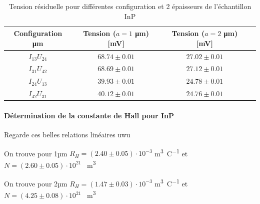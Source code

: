 
\begin{table}[h]
    \centering
    \begin{tabulary}{\textwidth}{C C C C}
        \toprule
        Configuration \si{\micro\meter} & Tension (\(a = 1\) \si{\micro\meter}) [\si{\milli\volt}] & Tension (\(a = 2\) \si{\micro\meter}) [\si{\milli\volt}] \\
        \midrule
        \(I_{13}U_{24}\) & \(68.74 \pm 0.01\) & \(27.02 \pm 0.01\) \\
        \(I_{31}U_{42}\) & \(68.69 \pm 0.01\) & \(27.12 \pm 0.01\) \\
        \(I_{24}U_{13}\) & \(39.93 \pm 0.01\) & \(24.78 \pm 0.01\) \\
        \(I_{42}U_{31}\) & \(40.12 \pm 0.01\) & \(24.76 \pm 0.01\) \\
        \bottomrule
    \end{tabulary}
    \caption{Tension résiduelle pour différentes configuration et 2 épaisseurs de l'échantillon InP}
    \label{tab:tension_residuelle}
\end{table}

\paragraph*{Détermination de la constante de Hall pour InP}
Regarde ces belles relations linéaires uwu

On trouve pour 1µm \(R_H = (2.40 \pm 0.05) \cdot 10^{-3}\) \si{\meter\cubed\per\coulomb} et \(N = (2.60 \pm 0.05) \cdot 10^{21}\) \si{\per\meter\cubed}

On trouve pour 2µm \(R_H = (1.47 \pm 0.03) \cdot 10^{-3}\) \si{\meter\cubed\per\coulomb} et \(N = (4.25 \pm 0.08) \cdot 10^{21}\) \si{\per\meter\cubed}

